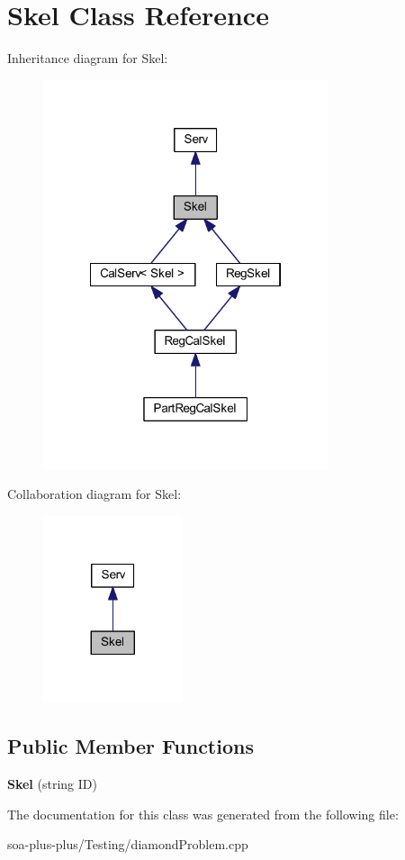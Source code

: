 \hypertarget{class_skel}{
\section{Skel Class Reference}
\label{class_skel}
}


Inheritance diagram for Skel:\nopagebreak
\begin{figure}[H]
\begin{center}
\leavevmode
\includegraphics[width=237pt]{class_skel__inherit__graph}
\end{center}
\end{figure}


Collaboration diagram for Skel:\nopagebreak
\begin{figure}[H]
\begin{center}
\leavevmode
\includegraphics[width=116pt]{class_skel__coll__graph}
\end{center}
\end{figure}
\subsection*{Public Member Functions}
\begin{DoxyCompactItemize}
\item 
\hypertarget{class_skel_a3f095af3caa34dc5b378cfb67150083d}{
{\bfseries Skel} (string ID)}
\label{class_skel_a3f095af3caa34dc5b378cfb67150083d}

\end{DoxyCompactItemize}


The documentation for this class was generated from the following file:\begin{DoxyCompactItemize}
\item 
soa-\/plus-\/plus/Testing/diamondProblem.cpp\end{DoxyCompactItemize}
